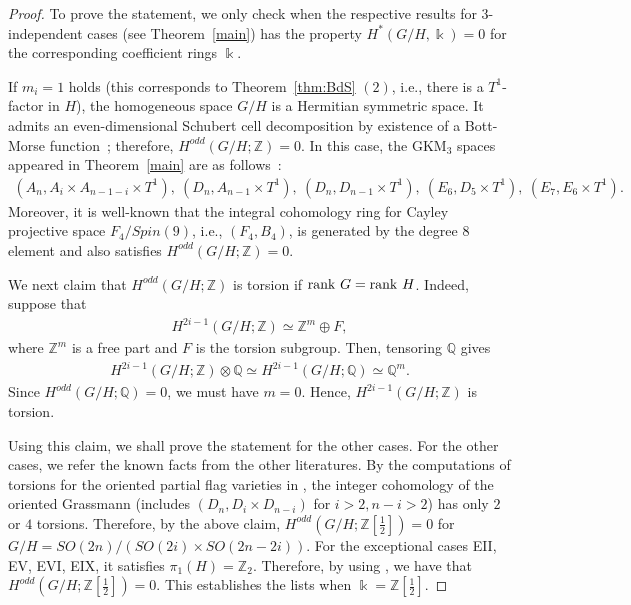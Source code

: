 \documentclass{amsart}
\theoremstyle{definition}
\theoremstyle{remark}
\numberwithin{equation}{section}
\begin{document}
\begin{proof}
To prove the statement, we only check when the respective results for $3$-independent cases (see Theorem~\ref{main}) has the property $H^{*}(G/H,\Bbbk)=0$ for the corresponding coefficient rings $\Bbbk$.

If $m_{i}=1$ holds (this corresponds to Theorem~\ref{thm:BdS} $(2)$, i.e., there is a $T^{1}$-factor in $H$), 
the homogeneous space $G/H$ is a Hermitian symmetric space.
It admits an even-dimensional Schubert cell decomposition by existence of a Bott-Morse function~\cite[Theorem A]{B56}; therefore, $H^{odd}(G/H;\mathbb{Z})=0$.
In this case, 
the GKM$_{3}$ spaces appeared in Theorem~\ref{main} are as follows~\cite[Corollary 8.11.7, p.293]{W11}:
\begin{align*}
(A_{n},A_{i}\times A_{n-1-i}\times T^{1}),\ 
(D_{n}, A_{n-1}\times T^{1}),\ 
(D_{n}, D_{n-1}\times T^{1}),\ 
(E_{6}, D_{5}\times T^{1}),\ 
(E_{7},E_{6}\times T^{1}).
\end{align*}
Moreover, it is well-known that the integral cohomology ring for Cayley projective space $F_{4}/Spin(9)$, i.e., $(F_{4},B_{4})$, is generated by the degree $8$ element and also satisfies $H^{odd}(G/H;\mathbb{Z})=0$.

We next claim that $H^{odd}(G/H;\mathbb{Z})$ is torsion if ${\rm rank}\ G={\rm rank}\ H$.
Indeed, suppose that
\begin{align*}
H^{2i-1}(G/H;\mathbb{Z})\simeq \mathbb{Z}^{m}\oplus F,
\end{align*}
where $\mathbb{Z}^{m}$ is a free part and $F$ is the torsion subgroup.
Then, tensoring $\mathbb{Q}$ gives 
\begin{align*}
H^{2i-1}(G/H;\mathbb{Z})\otimes \mathbb{Q}\simeq H^{2i-1}(G/H;\mathbb{Q})\simeq \mathbb{Q}^{m}. 
\end{align*}
Since $H^{odd}(G/H;\mathbb{Q})=0$, we must have $m=0$. 
Hence, $H^{2i-1}(G/H;\mathbb{Z})$ is torsion.

Using this claim, we shall prove the statement for the other cases.
For the other cases, we refer the known facts from the other literatures.
By the computations of torsions for the oriented partial flag varieties in \cite[Theorem 1.2]{MW}, the integer cohomology of the oriented Grassmann (includes $(D_{n}, D_{i}\times D_{n-i})$ for $i>2,n-i>2$) has only $2$ or $4$ torsions. 
Therefore, by the above claim, $H^{odd}(G/H;\mathbb{Z}[\frac{1}{2}])=0$ for $G/H=SO(2n)/(SO(2i)\times SO(2n-2i))$.
For the exceptional cases EII, EV, EVI, EIX, it satisfies $\pi_{1}(H)=\mathbb{Z}_{2}$. Therefore, by using \cite[Proposition 3.3]{IT}, we have that $H^{odd}(G/H;\mathbb{Z}[\frac{1}{2}])=0$.
This establishes the lists when $\Bbbk=\mathbb{Z}[\frac{1}{2}]$.
\end{proof}
\end{document}
